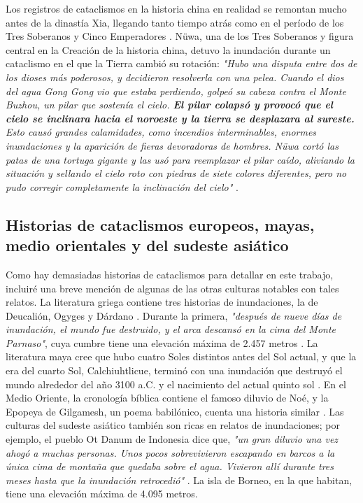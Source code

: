 \documentclass[10pt,twocolumn,letterpaper]{article}
\begin{document}
Los registros de cataclismos en la historia china en realidad se remontan mucho antes de la dinastía Xia, llegando tanto tiempo atrás como en el período de los Tres Soberanos y Cinco Emperadores \cite{7}. Nüwa, una de los Tres Soberanos y figura central en la Creación de la historia china, detuvo la inundación durante un cataclismo en el que la Tierra cambió su rotación: \textit{"Hubo una disputa entre dos de los dioses más poderosos, y decidieron resolverla con una pelea. Cuando el dios del agua Gong Gong vio que estaba perdiendo, golpeó su cabeza contra el Monte Buzhou, un pilar que sostenía el cielo. \textbf{El pilar colapsó y provocó que el cielo se inclinara hacia el noroeste y la tierra se desplazara al sureste.} Esto causó grandes calamidades, como incendios interminables, enormes inundaciones y la aparición de fieras devoradoras de hombres. Nüwa cortó las patas de una tortuga gigante y las usó para reemplazar el pilar caído, aliviando la situación y sellando el cielo roto con piedras de siete colores diferentes, pero no pudo corregir completamente la inclinación del cielo"} \cite{8}.

\subsection{Historias de cataclismos europeos, mayas, medio orientales y del sudeste asiático}

Como hay demasiadas historias de cataclismos para detallar en este trabajo, incluiré una breve mención de algunas de las otras culturas notables con tales relatos. La literatura griega contiene tres historias de inundaciones, la de Deucalión, Ogyges y Dárdano \cite{9,10}. Durante la primera, \textit{"después de nueve días de inundación, el mundo fue destruido, y el arca descansó en la cima del Monte Parnaso"}, cuya cumbre tiene una elevación máxima de 2.457 metros \cite{11}. La literatura maya cree que hubo cuatro Soles distintos antes del Sol actual, y que la era del cuarto Sol, Calchiuhtlicue, terminó con una inundación que destruyó el mundo alrededor del año 3100 a.C. y el nacimiento del actual quinto sol \cite{12}. En el Medio Oriente, la cronología bíblica contiene el famoso diluvio de Noé, y la Epopeya de Gilgamesh, un poema babilónico, cuenta una historia similar \cite{13}. Las culturas del sudeste asiático también son ricas en relatos de inundaciones; por ejemplo, el pueblo Ot Danum de Indonesia dice que, \textit{"un gran diluvio una vez ahogó a muchas personas. Unos pocos sobrevivieron escapando en barcos a la única cima de montaña que quedaba sobre el agua. Vivieron allí durante tres meses hasta que la inundación retrocedió"} \cite{3}. La isla de Borneo, en la que habitan, tiene una elevación máxima de 4.095 metros.
\end{document}
